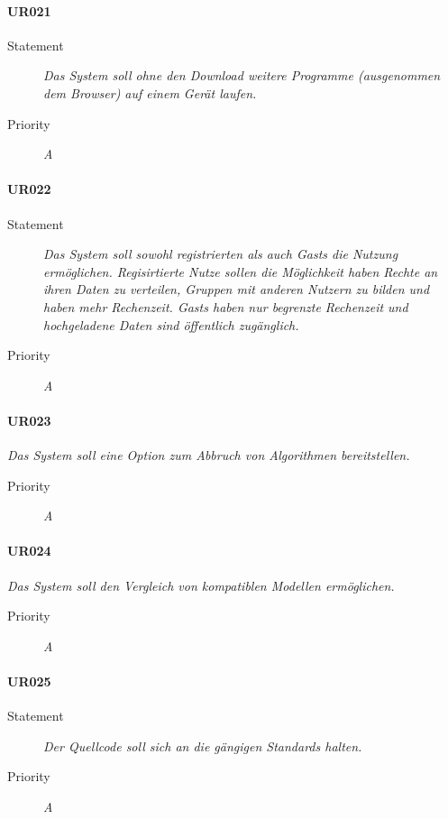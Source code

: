 \paragraph{UR021}
\begin{description}
\item[Statement] \textit{Das System soll ohne den Download weitere Programme (ausgenommen dem Browser) auf einem Gerät laufen.}
\item[Priority] \textit{A}
\end{description}

\paragraph{UR022}
\begin{description}
\item[Statement] \textit{Das System soll sowohl registrierten als auch \glspl{Gast} die Nutzung ermöglichen. Regisirtierte Nutze sollen die Möglichkeit haben Rechte an ihren Daten zu verteilen, Gruppen mit anderen Nutzern zu bilden und haben mehr Rechenzeit. \glspl{Gast} haben nur begrenzte Rechenzeit und hochgeladene Daten sind öffentlich zugänglich.}
\item[Priority] \textit{A}
\end{description}

\paragraph{UR023}
\item[Statement] \textit{Das System soll eine Option zum Abbruch von Algorithmen bereitstellen.}
\begin{description}
\item[Priority] \textit{A}
\end{description}


\paragraph{UR024}
\item[Statement] \textit{Das System soll den Vergleich von kompatiblen Modellen ermöglichen.}
\begin{description}
\item[Priority] \textit{A}
\end{description}


\paragraph{UR025}
\begin{description}
\item[Statement] \textit{Der Quellcode soll sich an die gängigen Standards halten.}
\item[Priority] \textit{A}
\end{description}

